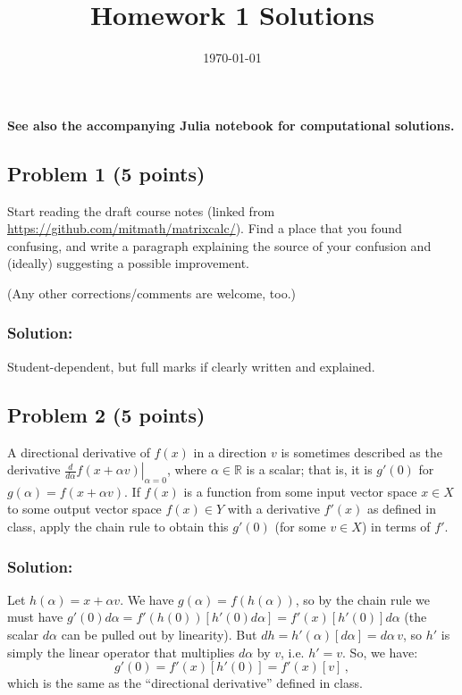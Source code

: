 \documentclass[10pt,oneside]{article}
\author{}
\title{Homework 1 Solutions}
\date{\today}
\begin{document}
\maketitle
\thispagestyle{fancy} 

{\bf See also the accompanying Julia notebook for computational solutions.  }

\subsection*{Problem 1 (5 points)}

Start reading the draft course notes (linked from \url{https://github.com/mitmath/matrixcalc/}).   Find a place that you found confusing, and write a paragraph explaining the source of your confusion and (ideally) suggesting a possible improvement.

(Any other corrections/comments are welcome, too.)

\subsubsection*{Solution:}

Student-dependent, but full marks if clearly written and explained.

\subsection*{Problem 2 (5 points)}

A directional derivative of $f(x)$ in a direction $v$ is sometimes described as the derivative $\left. \frac{d}{d\alpha} f(x + \alpha v) \right|_{\alpha = 0}$, where $\alpha \in \mathbb{R} $ is a scalar; that is, it is $g'(0)$ for $g(\alpha) = f(x + \alpha v)$.   If $f(x)$ is a function from some input vector space $x \in X$ to some output vector space $f(x) \in Y$ with a derivative $f'(x)$ as defined in class, apply the chain rule to obtain this $g'(0)$ (for some $v \in X$) in terms of $f'$.

\subsubsection*{Solution:}

Let $h(\alpha) = x + \alpha v$.  We have $g(\alpha) = f(h(\alpha))$, so by the chain rule we must have $g'(0) d\alpha = f'(h(0)) [ h'(0) d\alpha ] = f'(x) [ h'(0) ] d\alpha $ (the scalar $d\alpha$ can be pulled out by linearity).  But $dh = h'(\alpha)[d\alpha] = d\alpha \, v$, so $h'$ is simply the linear operator that multiplies $d\alpha$ by $v$, i.e. $h' = v$.  So, we have:
$$
g'(0) = f'(x) [ h'(0) ] = \boxed{ f'(x) [ v ] } \, ,
$$
which is the same as the ``directional derivative'' defined in class. 
\end{document}
